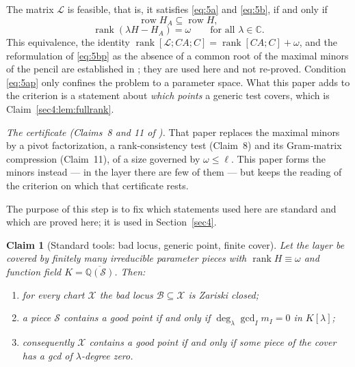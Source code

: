 \documentclass[journal]{IEEEtran}
\theoremstyle{plainn}
\newtheorem{claim}{Claim}
\theoremstyle{remark}
\newcommand{\row}{\operatorname{row}}
\newcommand{\rank}{\operatorname{rank}}
\begin{document}
The matrix $\mathcal L$ is feasible, that is, it satisfies \eqref{eq:5a} and \eqref{eq:5b}, if and only
if
\begin{equation}
  \label{eq:5ap}
  \row H_A\subseteq\row H,
\end{equation}
\begin{equation}
  \label{eq:5bp}
  \rank(\lambda H-H_A)=\omega\qquad\text{for all }\lambda\in\mathbb C .
\end{equation}
This equivalence, the identity $\rank[\mathcal L;CA;C]=\rank[CA;C]+\omega$, and the reformulation of
\eqref{eq:5bp} as the absence of a common root of the maximal minors of the pencil are established in
\cite{companion1}; they are used here and not re-proved. Condition \eqref{eq:5ap} only confines the
problem to a parameter space. What this paper adds to the criterion is a statement about \emph{which
points} a generic test covers, which is Claim~\ref{sec4:lem:fullrank}.


\emph{The certificate (Claims~8 and 11 of \cite{companion1}).} That paper replaces the maximal minors
by a pivot factorization, a rank-consistency test (Claim~8) and its Gram-matrix compression
(Claim~11), of a size governed by $\omega\le\ell$. This paper forms the minors instead --- in the layer
there are few of them --- but keeps the reading of the criterion on which that certificate rests.

The purpose of this step is to fix which statements used here are standard and which are proved here; it
is used in Section~\ref{sec4}.

\begin{claim}[Standard tools: bad locus, generic point, finite cover]
\label{sec4:thm:closed}
\label{sec4:thm:generic}
\label{sec4:prop:cover}
Let the layer be covered by finitely many irreducible parameter pieces with $\rank H\equiv\omega$ and
function field $K=\overline{\mathbb Q(\mathcal S)}$. Then:
\begin{enumerate}[label=(\alph*),leftmargin=*]
\item \label{it:closed} for every chart $\mathcal X$ the bad locus $\mathcal B\subseteq\mathcal X$ is
Zariski closed;
\item \label{it:generic} a piece $\mathcal S$ contains a good point if and only if
$\deg_\lambda\gcd_I m_I=0$ in $K[\lambda]$;
\item \label{it:cover} consequently $\mathcal X$ contains a good point if and only if some piece of the
cover has a gcd of $\lambda$-degree zero.
\end{enumerate}
\end{claim}
\end{document}
